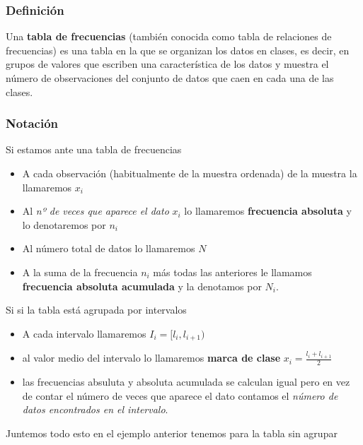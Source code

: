 \documentclass[]{article}
\providecommand{\tightlist}{%
  \setlength{\itemsep}{0pt}\setlength{\parskip}{0pt}}
\theoremstyle{plain}
\theoremstyle{definition}
\theoremstyle{definition} %
\begin{document}
\hypertarget{definiciuxf3n}{%
\subsubsection{Definición}\label{definiciuxf3n}}

Una \textbf{tabla de frecuencias} (también conocida como tabla de
relaciones de frecuencias) es una tabla en la que se organizan los datos
en clases, es decir, en grupos de valores que escriben una
característica de los datos y muestra el número de observaciones del
conjunto de datos que caen en cada una de las clases.

\hypertarget{notaciuxf3n}{%
\subsubsection{Notación}\label{notaciuxf3n}}

Si estamos ante una tabla de frecuencias

\begin{itemize}
\tightlist
\item
  A cada observación (habitualmente de la muestra ordenada) de la
  muestra la llamaremos \(x_i\)
\item
  Al \emph{nº de veces que aparece el dato} \(x_i\) lo llamaremos
  \textbf{frecuencia absoluta} y lo denotaremos por \(n_i\)
\item
  Al número total de datos lo llamaremos \(N\)
\item
  A la suma de la frecuencia \(n_i\) más todas las anteriores le
  llamamos \textbf{frecuencia absoluta acumulada} y la denotamos por
  \(N_i\).
\end{itemize}

Si si la tabla está agrupada por intervalos

\begin{itemize}
\tightlist
\item
  A cada intervalo llamaremos \(I_i = [l_i, l_{i+1})\)
\item
  al valor medio del intervalo lo llamaremos \textbf{marca de clase}
  \(x_i = \frac{l_i+ l_{i+1}}{2}\)
\item
  las frecuencias absuluta y absoluta acumulada se calculan igual pero
  en vez de contar el número de veces que aparece el dato contamos el
  \emph{número de datos encontrados en el intervalo}.
\end{itemize}

Juntemos todo esto en el ejemplo anterior tenemos para la tabla sin
agrupar
\end{document}
